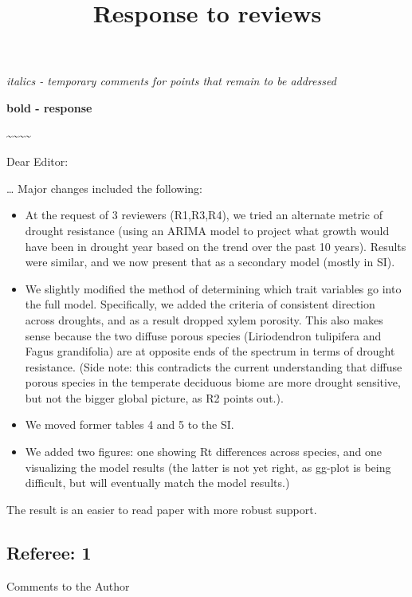 \documentclass[
]{article}
\title{Response to reviews}
\author{}
\date{\vspace{-2.5em}}
\begin{document}
\maketitle

\emph{italics - temporary comments for points that remain to be
addressed}

\textbf{bold - response}

\textasciitilde\textasciitilde\textasciitilde\textasciitilde{}

Dear Editor:

\ldots{} Major changes included the following:

\begin{itemize}
\item
  At the request of 3 reviewers (R1,R3,R4), we tried an alternate metric
  of drought resistance (using an ARIMA model to project what growth
  would have been in drought year based on the trend over the past 10
  years). Results were similar, and we now present that as a secondary
  model (mostly in SI).
\item
  We slightly modified the method of determining which trait variables
  go into the full model. Specifically, we added the criteria of
  consistent direction across droughts, and as a result dropped xylem
  porosity. This also makes sense because the two diffuse porous species
  (Liriodendron tulipifera and Fagus grandifolia) are at opposite ends
  of the spectrum in terms of drought resistance. (Side note: this
  contradicts the current understanding that diffuse porous species in
  the temperate deciduous biome are more drought sensitive, but not the
  bigger global picture, as R2 points out.).
\item
  We moved former tables 4 and 5 to the SI.
\item
  We added two figures: one showing Rt differences across species, and
  one visualizing the model results (the latter is not yet right, as
  gg-plot is being difficult, but will eventually match the model
  results.)
\end{itemize}

The result is an easier to read paper with more robust support.

\newpage

\hypertarget{referee-1}{%
\subsection{Referee: 1}\label{referee-1}}

Comments to the Author
\end{document}
